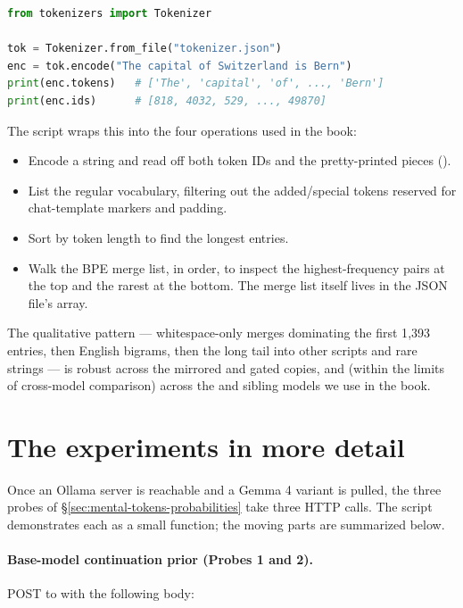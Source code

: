 \begin{lstlisting}[language=Python,basicstyle=\ttfamily\footnotesize,numbers=none,frame=single,framerule=0.4pt,xleftmargin=1em,xrightmargin=1em]
from tokenizers import Tokenizer

tok = Tokenizer.from_file("tokenizer.json")
enc = tok.encode("The capital of Switzerland is Bern")
print(enc.tokens)   # ['The', 'capital', 'of', ..., 'Bern']
print(enc.ids)      # [818, 4032, 529, ..., 49870]
\end{lstlisting}

\noindent
The script  wraps this
into the four operations used in the book:

\begin{itemize}[leftmargin=1.5em,itemsep=0.2em]
\item Encode a string and read off both token IDs and the
  pretty-printed pieces ().
\item List the regular vocabulary, filtering out the added/special
  tokens reserved for chat-template markers and padding.
\item Sort by token length to find the longest entries.
\item Walk the BPE merge list, in order, to inspect the
  highest-frequency pairs at the top and the rarest at the
  bottom. The merge list itself lives in the JSON file's
   array.
\end{itemize}

\noindent
The qualitative pattern --- whitespace-only merges dominating
the first 1{,}393 entries, then English bigrams, then the long
tail into other scripts and rare strings --- is robust across
the mirrored and gated copies, and (within the limits of
cross-model comparison) across the  and
 sibling models we use in the book.

\section{The experiments in more detail}
\label{sec:app-logprob-probes}

Once an Ollama server is reachable and a Gemma 4 variant is
pulled, the three probes of \S\ref{sec:mental-tokens-probabilities}
take three HTTP calls. The script
 demonstrates
each as a small function; the moving parts are summarized below.

\paragraph{Base-model continuation prior (Probes 1 and 2).}
POST to  with the following body:


